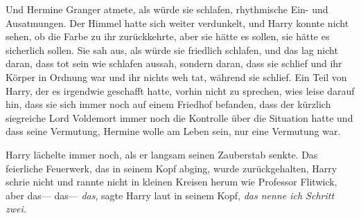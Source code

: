 Und Hermine Granger atmete, als würde sie schlafen, rhythmische Ein- und Ausatmungen. Der Himmel hatte sich weiter verdunkelt, und Harry konnte nicht sehen, ob die Farbe zu ihr zurückkehrte, aber sie hätte es sollen, sie hätte es sicherlich sollen. Sie sah aus, als würde sie friedlich schlafen, und das lag nicht daran, dass tot sein wie schlafen aussah, sondern daran, dass sie schlief und ihr Körper in Ordnung war und ihr nichts weh tat, während sie schlief.
Ein Teil von Harry, der es irgendwie geschafft hatte, vorhin nicht zu sprechen, wies leise darauf hin, dass sie sich immer noch auf einem Friedhof befanden, dass der kürzlich siegreiche Lord Voldemort immer noch die Kontrolle über die Situation hatte und dass seine Vermutung, Hermine wolle am Leben sein, nur eine Vermutung war.

Harry lächelte immer noch, als er langsam seinen Zauberstab senkte. Das feierliche Feuerwerk, das in seinem Kopf abging, wurde zurückgehalten, Harry schrie nicht und rannte nicht in kleinen Kreisen herum wie Professor Flitwick, aber das—
das—
\emph{\emph{das}}, sagte Harry laut in seinem Kopf, \emph{\emph{das} nenne ich Schritt zwei.}

